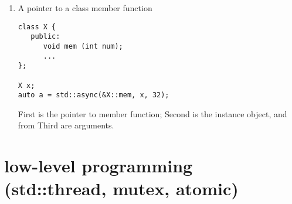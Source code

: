 \begin{enumerate}
   \item A pointer to a class member function
   \begin{lstlisting}
class X {
   public: 
      void mem (int num);
      ...
};

X x;
auto a = std::async(&X::mem, x, 32);
\end{lstlisting}
First is the pointer to member function; Second is the instance object, and from
Third are arguments.
\end{enumerate}









\section{low-level programming (std::thread, mutex, atomic)}

